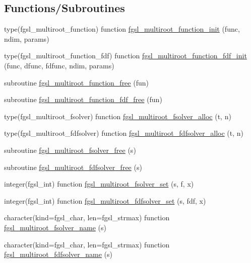 \subsection*{Functions/\+Subroutines}
\begin{DoxyCompactItemize}
\item 
type(fgsl\+\_\+multiroot\+\_\+function) function \hyperlink{multiroots_8finc_a78b20b390717ee23f7939615cbe93ff5}{fgsl\+\_\+multiroot\+\_\+function\+\_\+init} (func, ndim, params)
\item 
type(fgsl\+\_\+multiroot\+\_\+function\+\_\+fdf) function \hyperlink{multiroots_8finc_aa6562b8729129576adc2644344af1d82}{fgsl\+\_\+multiroot\+\_\+function\+\_\+fdf\+\_\+init} (func, dfunc, fdfunc, ndim, params)
\item 
subroutine \hyperlink{multiroots_8finc_a9b0beb12d58e735ed7597de7271439fc}{fgsl\+\_\+multiroot\+\_\+function\+\_\+free} (fun)
\item 
subroutine \hyperlink{multiroots_8finc_ab1e9265827f89cd911c898df0eb8657d}{fgsl\+\_\+multiroot\+\_\+function\+\_\+fdf\+\_\+free} (fun)
\item 
type(fgsl\+\_\+multiroot\+\_\+fsolver) function \hyperlink{multiroots_8finc_a9967caceee0113037f46962e830a3d7d}{fgsl\+\_\+multiroot\+\_\+fsolver\+\_\+alloc} (t, n)
\item 
type(fgsl\+\_\+multiroot\+\_\+fdfsolver) function \hyperlink{multiroots_8finc_ab89adde0a73d47f7bcc272997b3f6c8d}{fgsl\+\_\+multiroot\+\_\+fdfsolver\+\_\+alloc} (t, n)
\item 
subroutine \hyperlink{multiroots_8finc_a062ba1ccc85350d3089b310296166e7c}{fgsl\+\_\+multiroot\+\_\+fsolver\+\_\+free} (s)
\item 
subroutine \hyperlink{multiroots_8finc_aee27003f4d58d412ebbde4d72eace13e}{fgsl\+\_\+multiroot\+\_\+fdfsolver\+\_\+free} (s)
\item 
integer(fgsl\+\_\+int) function \hyperlink{multiroots_8finc_a85ec239778cc40c12c0cdda378b3f704}{fgsl\+\_\+multiroot\+\_\+fsolver\+\_\+set} (s, f, x)
\item 
integer(fgsl\+\_\+int) function \hyperlink{multiroots_8finc_a11f98af2f96332f471fa4cdcce719b0a}{fgsl\+\_\+multiroot\+\_\+fdfsolver\+\_\+set} (s, fdf, x)
\item 
character(kind=fgsl\+\_\+char, len=fgsl\+\_\+strmax) function \hyperlink{multiroots_8finc_aa0ce2f798740b7d41bed54676c414514}{fgsl\+\_\+multiroot\+\_\+fsolver\+\_\+name} (s)
\item 
character(kind=fgsl\+\_\+char, len=fgsl\+\_\+strmax) function \hyperlink{multiroots_8finc_abc59e0be63f6c4126420aeab1c20081c}{fgsl\+\_\+multiroot\+\_\+fdfsolver\+\_\+name} (s)

\end{DoxyCompactItemize}
